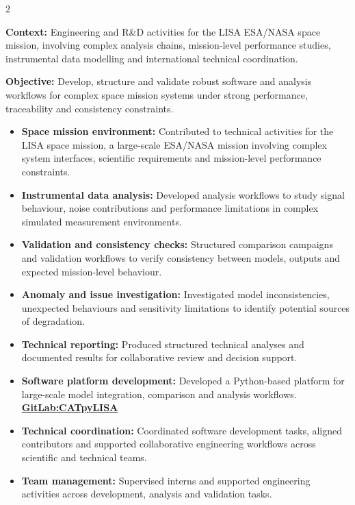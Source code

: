 \documentclass[8pt,a4paper,ragged2e,withhyper]{altacv}
\begin{document}
\begin{paracol}{2}
\divider


\textbf{Context:} Engineering and R\&D activities for the LISA ESA/NASA space mission, involving complex analysis chains, mission-level performance studies, instrumental data modelling and international technical coordination.

\textbf{Objective:} Develop, structure and validate robust software and analysis workflows for complex space mission systems under strong performance, traceability and consistency constraints.

\begin{itemize}
\item \textbf{Space mission environment:} Contributed to technical activities for the LISA space mission, a large-scale ESA/NASA mission involving complex system interfaces, scientific requirements and mission-level performance constraints.
\item \textbf{Instrumental data analysis:} Developed analysis workflows to study signal behaviour, noise contributions and performance limitations in complex simulated measurement environments.
\item \textbf{Validation and consistency checks:} Structured comparison campaigns and validation workflows to verify consistency between models, outputs and expected mission-level behaviour.
\item \textbf{Anomaly and issue investigation:} Investigated model inconsistencies, unexpected behaviours and sensitivity limitations to identify potential sources of degradation.
\item \textbf{Technical reporting:} Produced structured technical analyses and documented results for collaborative review and decision support.
\item \textbf{Software platform development:} Developed a Python-based platform for large-scale model integration, comparison and analysis workflows. \textcolor{DarkPastelRed}{\href{https://gitlab.oca.eu/gboileau/lisa_l3_tools}{\bf GitLab:CATpyLISA}}
\item \textbf{Technical coordination:} Coordinated software development tasks, aligned contributors and supported collaborative engineering workflows across scientific and technical teams.
\item \textbf{Team management:} Supervised interns and supported engineering activities across development, analysis and validation tasks.
\end{itemize}


\end{paracol}
\end{document}
